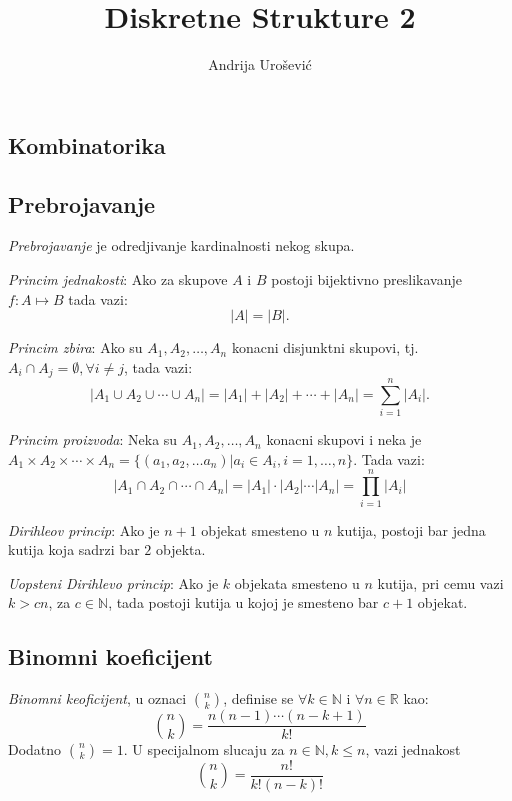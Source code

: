 \documentclass[12p, a4paper]{article}
\title{Diskretne Strukture 2}
\author{Andrija Urošević}
\begin{document}
\maketitle

\begin{multicols}{2}

\section{Kombinatorika}

\subsection{Prebrojavanje}

    \emph{Prebrojavanje} je odredjivanje kardinalnosti nekog skupa.

    \emph{Princim jednakosti}: Ako za skupove $A$ i $B$ postoji bijektivno 
    preslikavanje $f: A \mapsto B$ tada vazi:
    \[ |A| = |B|. \]
    
    \emph{Princim zbira}: Ako su $A_1, A_2, \ldots, A_n$ konacni disjunktni 
    skupovi, tj.\ $A_i \cap A_j = \emptyset, \forall i \neq j$, tada vazi:
    \[ 
        |A_1 \cup A_2 \cup \cdots \cup A_n| = 
        |A_1| + |A_2| + \cdots + |A_n| =
        \sum_{i=1}^n |A_i|.
    \]

    \emph{Princim proizvoda}: Neka su $A_1, A_2, \ldots, A_n$ konacni skupovi
    i neka je $A_1 \times A_2 \times \cdots \times A_n = 
    \{(a_1, a_2, \ldots a_n) | a_i \in A_i, i = 1,\ldots, n\}$. Tada vazi:
    \[
        |A_1 \cap A_2 \cap \cdots \cap A_n| = 
        |A_1| \cdot |A_2| \cdots |A_n| = 
        \prod_{i=1}^n |A_i|
    \]

    \emph{Dirihleov princip}: Ako je $n+1$ objekat smesteno u $n$ kutija, 
    postoji bar jedna kutija koja sadrzi bar $2$ objekta.

    \emph{Uopsteni Dirihlevo princip}: Ako je $k$ objekata smesteno u $n$ 
    kutija, pri cemu vazi $k > cn$, za $c \in \mathbb{N}$, tada postoji kutija 
    u kojoj je smesteno bar $c + 1$ objekat.

\subsection{Binomni koeficijent}

    \emph{Binomni keoficijent}, u oznaci $\binom{n}{k}$, definise se 
    $\forall k \in \mathbb{N}$ i $\forall n \in \mathbb{R}$ kao:
    \[ 
        \binom{n}{k} = 
        \frac{n (n - 1) \cdots (n - k + 1)}{k!}
    \]
    Dodatno $\binom{n}{k} = 1$. U specijalnom slucaju za 
    $n \in \mathbb{N}, k \leq n$, vazi jednakost
    \[
        \binom{n}{k} =
        \frac{n!}{k! (n - k)!}
    \]


\end{multicols}
\end{document}
